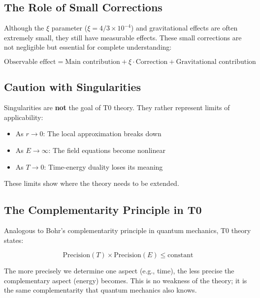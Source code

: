	\subsection{The Role of Small Corrections}
	
	Although the $\xi$ parameter ($\xi = 4/3 \times 10^{-4}$) and gravitational effects are often extremely small, they still have measurable effects. These small corrections are not negligible but essential for complete understanding:
	
	\begin{equation}
		\text{Observable effect} = \text{Main contribution} + \xi \cdot \text{Correction} + \text{Gravitational contribution}
	\end{equation}
	
	\subsection{Caution with Singularities}
	
	\begin{tcolorbox}[colback=t0yellow!10!white, colframe=t0yellow!75!black, title=Important Insight]
		Singularities are \textbf{not} the goal of T0 theory. They rather represent limits of applicability:
		\begin{itemize}
			\item As $r \to 0$: The local approximation breaks down
			\item As $E \to \infty$: The field equations become nonlinear
			\item As $T \to 0$: Time-energy duality loses its meaning
		\end{itemize}
		These limits show where the theory needs to be extended.
	\end{tcolorbox}
	
	\subsection{The Complementarity Principle in T0}
	
	Analogous to Bohr's complementarity principle in quantum mechanics, T0 theory states:
	
	\begin{equation}
		\text{Precision}(T) \times \text{Precision}(E) \leq \text{constant}
	\end{equation}
	
	The more precisely we determine one aspect (e.g., time), the less precise the complementary aspect (energy) becomes. This is no weakness of the theory; it is the same complementarity that quantum mechanics also knows.
	
